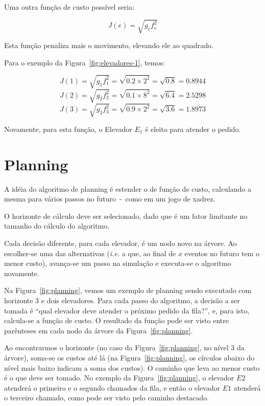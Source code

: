 Uma outra função de custo possível seria:

\[J(e) = \sqrt{g_{e}f_{e}^{2}}\]

Esta função penaliza mais o movimento, elevando ele ao quadrado.

Para o exemplo da Figura~\ref{fig:elevadores-1}, temos:

\[J(1) = \sqrt{g_{1}f_{1}^{2}} = \sqrt{0.2 \times 2^2} = \sqrt{0.8} = 0.8944\]
\[J(2) = \sqrt{g_{2}f_{2}^{2}} = \sqrt{0.1 \times 8^2} = \sqrt{6.4} = 2.5298\]
\[J(3) = \sqrt{g_{3}f_{3}^{2}} = \sqrt{0.9 \times 2^2} = \sqrt{3.6} = 1.8973\]

Novamente, para esta função, o Elevador $E_{1}$ é eleito para atender o pedido.

\section{Planning}


A idéia do algoritmo de planning é estender o de função de custo, calculando a
mesma para vários passos no futuro~-~como em um jogo de xadrez.

O horizonte de cálculo deve ser selecionado, dado que é um fator limitante no
tamanho do cálculo do algoritmo.

Cada decisão diferente, para cada elevador, é um nodo novo na árvore. Ao
escolher-se uma das alternativas (\textit{i.e.} a que, ao final de $x$ eventos
no futuro tem o menor custo), avança-se um passo na simulação e executa-se o
algoritmo novamente.

Na Figura~\ref{fig:planning}, vemos um exemplo de planning sendo executado com
horizonte 3 e dois elevadores. Para cada passo do algoritmo, a decisão a ser
tomada é ``qual elevador deve atender o próximo pedido da fila?'', e, para isto,
calcula-se a função de custo. O resultado da função pode ser visto entre
parênteses em cada nodo da árvore da Figura~\ref{fig:planning}.

Ao encontrarmos o horizonte (no caso da Figura~\ref{fig:planning}, no nível 3 da
árvore), soma-se os custos até lá (na Figura~\ref{fig:planning}, os círculos
abaixo do nível mais baixo indicam a soma dos custos). O caminho que leva ao
menor custo é o que deve ser tomado. No exemplo da Figura~\ref{fig:planning}, o
elevador $E2$ atenderá o primeiro e o segundo chamados da fila, e então o
elevador $E1$ atenderá o terceiro chamado, como pode ser visto pelo caminho destacado.

